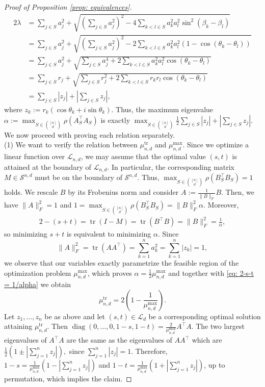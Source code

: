 \documentclass[reqno,hidelinks,11pt]{amsart}
\numberwithin{equation}{section}
\def\b{\beta}
\def\diag{\operatorname{diag}}
\def\S{\mathcal{S}}
\def\tr{\operatorname{tr}}
\begin{document}
\begin{proof}[Proof of Proposition \ref{prop: equivalences}]
\begin{align*}
    2\lambda&=\sum_{j \in S} a_j^2+\sqrt{\left(\sum_{j \in S} a_j^2\right)^2-4\sum_{k<l \in S}a_k^2a_l^2\sin^2(\b_k-\b_l)}\\
    &=\sum_{j \in S} a_j^2+\sqrt{\left(\sum_{j \in S} a_j^2\right)^2-2\sum_{k<l \in S}a_k^2a_l^2(1-\cos(\theta_k-\theta_l))}\\
    &=\sum_{j \in S} a_j^2+\sqrt{\sum_{j \in S} a_j^4+2\sum_{k<l \in S}a_k^2a_l^2\cos(\theta_k-\theta_l)}\\
    &=\sum_{j \in S} r_j+\sqrt{\sum_{j \in S} r_j^2+2\sum_{k<l \in S}r_kr_l\cos(\theta_k-\theta_l)}\\
    &=\sum_{j\in S}|z_j|+\left|\sum_{j\in S} z_j\right|,
\end{align*}
where $z_k:=r_k(\cos\theta_k+i\sin \theta_k)$. Thus, the maximum eigenvalue $\alpha := \max_{S \in \binom{[n]}{d}}\rho(A_S^\top A_S)$ is exactly $\max_{S \in \binom{[n]}{d}} \frac{1}{2}\sum_{j\in S}|z_j|+\left|\sum_{j\in S} z_j\right|$.
We now proceed with proving each relation separately.\\
(1) We want to verify the relation between $\mu_{n,d}^{\tr}$ and $\mu_{n,d}^{\max}$. Since we optimize a linear function over $\mathcal{L}_{n,d}$, we may assume that the optimal value $(s,t)$ is attained at the boundary of $\mathcal{L}_{n,d}$. In particular, the corresponding matrix $M \in \S^{n,d}$ must be on the boundary of $\S^{n,d}$. Thus, $\max_{S \in \binom{[n]}{d}} \rho(B_S^\top B_S)=1$ holds. We rescale $B$ by its Frobenius norm and consider $A := \frac{1}{\|B\|_F} B$. Then, we have $\|A\|_F^2 =1$ and $ 1 = \max_{S \in \binom{[n]}{d}} \rho(B_S^\top B_S) = \|B\|_F^2 \alpha.$ Moreover,
    \begin{align}\label{eq: 2-s-t = 1/alpha}
    2-(s + t) = \tr (I-M) = \tr (B^\top B)  = \|B\|_{F}^2 = \frac{1}{\alpha},
    \end{align}
    so minimizing $s+t$ is equivalent to minimizing $\alpha$. Since 
    \[
    \|A\|_F^2 = \tr(AA^\top) = \sum_{k=1}^n a_k^2 = \sum_{k=1}^n |z_k|=1,
    \]
    we observe that our variables exactly parametrize the feasible region of the optimization problem $\mu_{n,d}^{\max}$, which proves $\alpha = \frac{1}{2} \mu_{n,d}^{\max}$ and together with \eqref{eq: 2-s-t = 1/alpha} we obtain \[\mu_{n,d}^{\tr}=2\left(1-\frac{1}{\mu_{n,d}^{\max}}\right).\]
    Let $z_1,\dots,z_n$ be as above and let $(s,t) \in \mathcal{L}_d$ be a corresponding optimal solution attaining $\mu_{n,d}^{\tr}$. Then $\diag(0,\dots,0,1-s,1-t)=\frac{2}{\mu_{n,d}^{\max}}A^\top A$. The two largest eigenvalues of $A^\top A$ are the same as the eigenvalues of $AA^\top$ which are $\frac{1}{2}(1\pm | \sum_{j=1}^nz_j |),$
since $\sum_{j=1}^n |z_j| =1$.
Therefore, $1-s=\frac{1}{\mu_{n,d}^{\max}}(1-|\sum_{j=1}^n z_j|)$ and $1-t=\frac{1}{\mu_{n,d}^{\max}}(1+|\sum_{j=1}^n z_j|)$, up to permutation, which implies the claim.



\end{proof}
\end{document}
